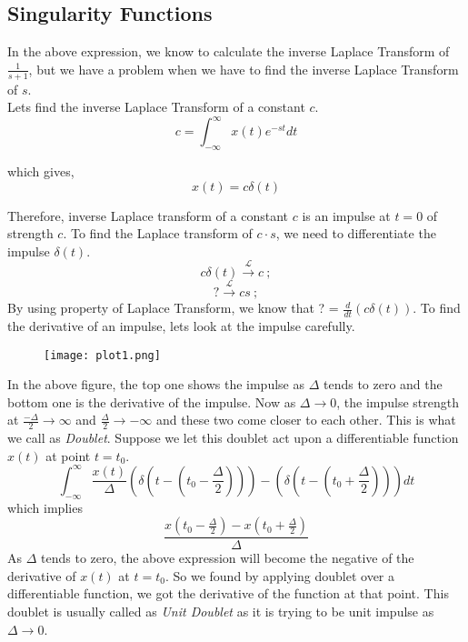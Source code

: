 \subsection{Singularity Functions}

\noindent
In the above expression, we know to calculate the inverse Laplace Transform of $\frac{1}{s+1}$, but we have a problem when we have to find the inverse Laplace Transform of $s$.\\

\noindent
Lets find the inverse Laplace Transform of a constant $c$.\\
\[
	c = \int_{-\infty}^{\infty}{x(t)e^{-st}dt}
\]

\noindent
which gives,\\
$$x(t) = c\delta(t)$$

\noindent
Therefore, inverse Laplace transform of a constant $c$ is an impulse at $t=0$ of strength $c$. To find the Laplace transform of $c\cdot s$, we need to differentiate the impulse $\delta(t)$.\\
\[
c\delta(t) \xrightarrow{\ \mathcal{L}\ } c\ ;
\]
\[
	? \xrightarrow{\ \mathcal{L}\ } cs\ ;
\]
\noindent
By using property of Laplace Transform, we know that ? = $\frac{d}{dt}(c\delta(t))$. To find the derivative of an impulse, lets look at the impulse carefully.\\
\begin{figure}[h!]
\begin{center}
\texttt{[image: plot1.png]}
\end{center}
\end{figure}

\noindent
In the above figure, the top one shows the impulse as $\Delta$ tends to zero and the bottom one is the derivative of the impulse. Now as $\Delta\rightarrow 0$, the impulse strength at $\frac{-\Delta}{2}\rightarrow \infty$ and $\frac{\Delta}{2}\rightarrow -\infty$ and these two come closer to each other. This is what we call as \emph{Doublet}. Suppose we let this doublet act upon a differentiable function $x(t)$ at point $t=t_0$.\\
\[
	 \int_{-\infty}^{\infty}{\frac{x(t)}{\Delta}(\delta(t-(t_0-\frac{\Delta}{2}))) - (\delta(t-(t_0+\frac{\Delta}{2})))} dt
\]
\noindent
which implies\\

\[
	\frac{x(t_0-\frac{\Delta}{2})-x(t_0+\frac{\Delta}{2})}{\Delta}
\]
\noindent
 As $\Delta$ tends to zero, the above expression will become the negative of the derivative of $x(t)$ at $t=t_0$. So we found by applying doublet over a differentiable function, we got the derivative of the function at that point. This doublet is usually called as \emph{Unit Doublet} as it is trying to be unit impulse as $\Delta\rightarrow 0$.\\
 
